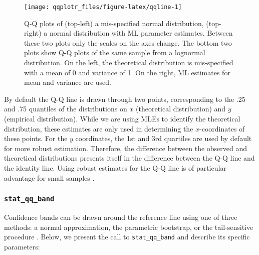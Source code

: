 \begin{Schunk}
\begin{figure}
\texttt{[image: qqplotr\_files/figure-latex/qqline-1]} \caption{Q-Q plots of (top-left) a mis-specified normal distribution, (top-right) a normal distribution with ML parameter estimates. Between these two plots only the scales on the axes change. The bottom two plots show Q-Q plots of the same sample from a lognormal distribution. On the left, the theoretical distribution is mis-specified with a mean of 0 and variance of 1. On the right, ML estimates for mean and variance are used. }\label{fig:qqline}
\end{figure}
\end{Schunk}



By default the Q-Q line is drawn through two points, corresponding to
the .25 and .75 quantiles of the distributions on \(x\) (theoretical
distribution) and \(y\) (empirical distribution). While we are using
MLEs to identify the theoretical distribution, these estimates are only
used in determining the \(x\)-coordinates of these points. For the \(y\)
coordinates, the 1st and 3rd quartiles are used by default for more
robust estimation. Therefore, the difference between the observed and
theoretical distributions presents itself in the difference between the
Q-Q line and the identity line. Using robust estimates for the Q-Q line
is of particular advantage for small samples \citep{Loy2016-fg}.

\subsubsection{\texorpdfstring{\texttt{stat\_qq\_band}}{stat\_qq\_band}}\label{stat_qq_band}

Confidence bands can be drawn around the reference line using one of
three methods: a normal approximation, the parametric bootstrap, or the
tail-sensitive procedure \citep{Aldor-Noiman2013-xw}. Below, we present
the call to \texttt{stat\_qq\_band} and describe its specific
parameters:

